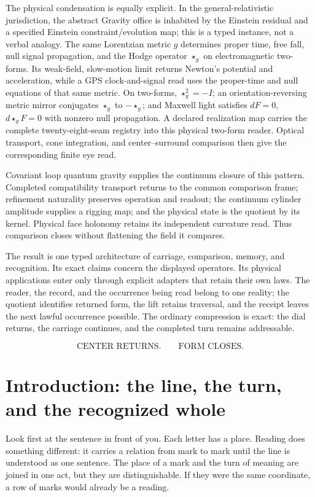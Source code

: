 \documentclass[10pt]{article}
\begin{document}
The physical condensation is equally explicit. In the general-relativistic
jurisdiction, the abstract Gravity office is inhabited by the Einstein
residual and a specified Einstein constraint/evolution map; this is a typed
instance, not a verbal analogy. The same Lorentzian metric $g$ determines
proper time, free fall, null signal propagation, and the Hodge operator
$\star_g$ on electromagnetic two-forms. Its weak-field, slow-motion limit
returns Newton's potential and acceleration, while a GPS clock-and-signal read
uses the proper-time and null equations of that same metric. On two-forms,
$\star_g^2=-I$; an orientation-reversing metric mirror conjugates $\star_g$ to
$-\star_g$; and Maxwell light satisfies $dF=0$, $d\star_gF=0$ with nonzero null
propagation. A declared realization map carries the complete
twenty-eight-seam registry into this physical two-form reader. Optical
transport, cone integration, and center--surround comparison then give the
corresponding finite eye read.

Covariant loop quantum gravity supplies the continuum closure of this pattern. Completed compatibility transport returns to the common comparison frame; refinement naturality preserves operation and readout; the continuum cylinder amplitude supplies a rigging map; and the physical state is the quotient by its kernel. Physical face holonomy retains its independent curvature read. Thus comparison closes without flattening the field it compares.

The result is one typed architecture of carriage, comparison, memory, and recognition. Its exact claims concern the displayed operators. Its physical applications enter only through explicit adapters that retain their own laws. The reader, the record, and the occurrence being read belong to one reality; the quotient identifies returned form, the lift retains traversal, and the receipt leaves the next lawful occurrence possible. The ordinary compression is exact: the dial returns, the carriage continues, and the completed turn remains addressable.

\begin{equation*}
\boxed{\text{CENTER RETURNS.}\qquad\text{FORM CLOSES.}}
\end{equation*}

\section{Introduction: the line, the turn, and the recognized whole}
Look first at the sentence in front of you. Each letter has a place. Reading does something different: it carries a relation from mark to mark until the line is understood as one sentence. The place of a mark and the turn of meaning are joined in one act, but they are distinguishable. If they were the same coordinate, a row of marks would already be a reading.
\end{document}
